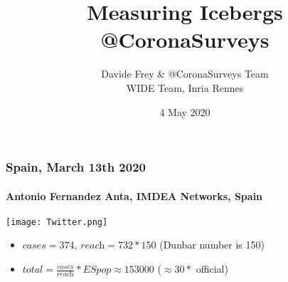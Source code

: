 \documentclass{beamer}
\title{Measuring Icebergs @CoronaSurveys}
\author{Davide Frey \& @CoronaSurveys Team\\
\vspace{8pt}WIDE Team, Inria Rennes}
\date{4 May 2020}
\begin{document}
\frame[plain]{
\titlepage
\begin{center}
\end{center}
}





\begin{frame}
  \frametitle{Spain, March 13th 2020}
  \framesubtitle{Antonio Fernandez Anta, IMDEA Networks, Spain}
  \begin{center}
  \texttt{[image: Twitter.png]}
  \end{center}
  \begin{itemize}
    \item $\textit{cases}=374$, $\textit{reach}=732*150$ \hfill (Dunbar number is 150)
    \item $\textit{total}=\frac{\textit{cases}}{\textit{reach}}*\textit{ESpop} \approx 153000 $ \hfill ($\approx 30*$ official)
  \end{itemize}
\end{frame}
\end{document}
